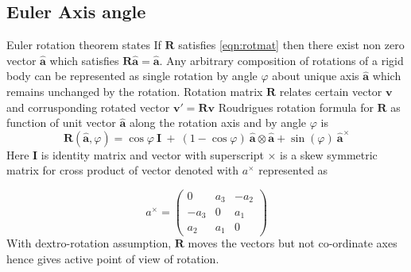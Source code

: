 \subsection{Euler Axis angle}

Euler rotation theorem states If $ \mathbf{R}$ satisfies \autoref{eqn:rotmat} then there exist non zero vector $ \hat{\mathbf{a}}$ which satisfies $ \mathbf{R\hat{a}} =\hat{\mathbf{a}}$. Any arbitrary composition of rotations of a rigid body can be represented as single rotation by angle $ \varphi $ about unique axis $ \hat{\mathbf{a}}$ which remains unchanged by the rotation.\cite{eulerAxis} Rotation matrix $ \mathbf{R}$ relates certain vector $ \mathbf{v}$ and corrusponding rotated vector $ \mathbf{v'} =\mathbf{Rv}$ Roudrigues rotation formula for $ \mathbf{R}$ as function of unit vector $ \hat{\mathbf{a}}$ along the rotation axis and by angle $ \varphi $ is
\begin{equation}
\mathbf{R}(\hat{\mathbf{a}} ,\varphi ) =\cos \varphi \ \mathbf{I} \ +\ ( 1-\cos \varphi ) \ \hat{\mathbf{a}} \otimes \hat{\mathbf{a}} +\sin( \varphi ) \ \hat{\mathbf{a}}^{\times }
\end{equation}
Here $\mathbf{I}$ is identity matrix and vector with superscript $\times$ is a skew symmetric matrix for cross product of vector denoted with $a^{\times}$ represented as

\begin{equation*}
a^{\times } =\begin{pmatrix}
0 & a_{3} & -a_{2}\\
-a_{3} & 0 & a_{1}\\
a_{2} & a_{1} & 0
\end{pmatrix}
\end{equation*}
With dextro-rotation assumption, $ \mathbf{R}$ moves the vectors but not co-ordinate axes hence gives active point of view of rotation.

